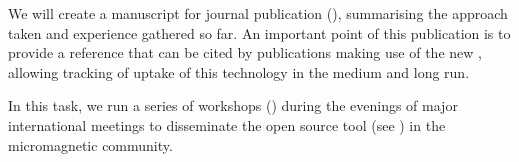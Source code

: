 \begin{workpackage}
\begin{tasklist}
\begin{task}[id=dissemination-of-oommf-nb-virtual-environment,
  title=Demonstrator: Open source dissemination of \OOMMFNB{} virtual environment,
  lead=USO,PM=5]
  We will create a manuscript for journal publication (), summarising the
  approach taken and experience gathered so far. An important point of
  this publication is to provide a reference that can be cited by
  publications making use of the new \OOMMFNB, allowing tracking of
  uptake of this technology in the medium and long run.
\end{task}

\begin{task}[title=\OOMMFNB{} open source dissemination workshops,
id=dissemination-of-oommf-nb-workshops,lead=USO,PM=6]



In this task, we run a series of workshops
() during the evenings of major
international meetings to disseminate the open source \OOMMFNB{} tool
(see
) in the
  micromagnetic community. 


\end{task}
\end{tasklist}
\end{workpackage}
